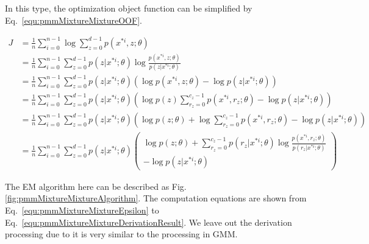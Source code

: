 \documentclass[runningheads,openany]{xhlPaper}
\begin{document}
In this type, the optimization object function can be simplified by Eq.~\ref{equ:pmmMixtureMixtureOOF}.

\begin{equation}
\label{equ:pmmMixtureMixtureOOF}
\begin{aligned}
J &= \frac{1}{n}\sum\limits_{i = 0}^{n - 1} {\log \sum\limits_{z = 0}^{d - 1} {p\left( {{x^{*i}},z;\theta } \right)} } \\
 &= \frac{1}{n}\sum\limits_{i = 0}^{n - 1} {\sum\limits_{z = 0}^{d - 1} {p\left( {z|{x^{*i}};\theta } \right)\log \frac{{p\left( {{x^{*i}},z;\theta } \right)}}{{p\left( {z|{x^{*i}};\theta } \right)}}} } \\
 &= \frac{1}{n}\sum\limits_{i = 0}^{n - 1} {\sum\limits_{z = 0}^{d - 1} {p\left( {z|{x^{*i}};\theta } \right)\left( {\log p\left( {{x^{*i}},z;\theta } \right) - \log p\left( {z|{x^{*i}};\theta } \right)} \right)} } \\
 &= \frac{1}{n}\sum\limits_{i = 0}^{n - 1} {\sum\limits_{z = 0}^{d - 1} {p\left( {z|{x^{*i}};\theta } \right)\left( {\log p\left( z \right)\sum\limits_{{r_z} = 0}^{{c_z} - 1} {p\left( {{x^{*i}},{r_z};\theta } \right)}  - \log p\left( {z|{x^{*i}};\theta } \right)} \right)} } \\
 &= \frac{1}{n}\sum\limits_{i = 0}^{n - 1} {\sum\limits_{z = 0}^{d - 1} {p\left( {z|{x^{*i}};\theta } \right)\left( {\log p\left( {z;\theta } \right) + \log \sum\limits_{{r_z} = 0}^{{c_z} - 1} {p\left( {{x^{*i}},{r_z};\theta } \right)}  - \log p\left( {z|{x^{*i}};\theta } \right)} \right)} } \\
 & = \frac{1}{n}\sum\limits_{i = 0}^{n - 1} {\sum\limits_{z = 0}^{d - 1} {p\left( {z|{x^{*i}};\theta } \right)\left( \begin{array}{l}
\log p\left( {z;\theta } \right) + \sum\limits_{{r_z} = 0}^{{c_z} - 1} {p\left( {{r_z}|{x^{*i}};\theta } \right)\log \frac{{p\left( {{x^{*i}},{r_z};\theta } \right)}}{{p\left( {{r_z}|{x^{*i}};\theta } \right)}}} \\
 - \log p\left( {z|{x^{*i}};\theta } \right)
\end{array} \right)} } 
\end{aligned}
\end{equation}

The EM algorithm here can be described as Fig.\ref{fig:pmmMixtureMixtureAlgorithm}. The computation equations are shown from Eq.~\ref{equ:pmmMixtureMixtureEpsilon} to Eq.~\ref{equ:pmmMixtureMixtureDerivationResult}. We leave out the derivation processing due to it is very similar to the processing in GMM.
\end{document}
